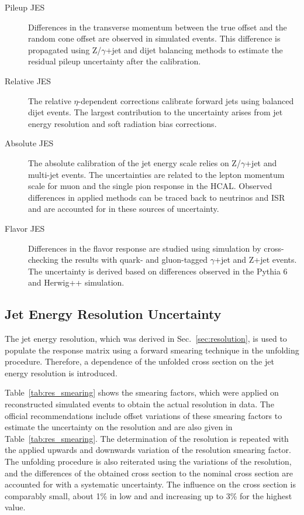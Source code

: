 \begin{description}
    \item[Pileup JES] Differences in the transverse momentum between the true
        offset and the random cone offset are observed in simulated events. This
        difference is propagated using Z/$\gamma$+jet and dijet balancing
        methods to estimate the residual pileup uncertainty after the
        calibration.
    \item[Relative JES] The relative $\eta$-dependent corrections calibrate
        forward jets using balanced dijet events. The largest contribution to
        the uncertainty arises from jet energy resolution and soft radiation
        bias corrections. 
    \item[Absolute JES]  The absolute calibration of the jet energy scale relies
        on Z/$\gamma$+jet and multi-jet events. The uncertainties are related to
        the lepton momentum scale for muon and the single pion response in the
        HCAL. Observed differences in applied methods can be traced back to neutrinos
        and ISR and are accounted for in these sources of uncertainty.
    \item[Flavor JES] Differences in the flavor response are studied using
        simulation by cross-checking the results with quark- and gluon-tagged
        $\gamma$+jet and Z+jet events. The uncertainty is derived based on
        differences observed in the Pythia 6 and Herwig++ simulation.
\end{description}

\subsection{Jet Energy Resolution Uncertainty}

The jet energy resolution, which was derived in Sec.~\ref{sec:resolution}, is
used to populate the response matrix using a forward smearing technique in the
unfolding procedure. Therefore, a dependence of the
unfolded cross section on the jet energy resolution is introduced. 

Table~\ref{tab:res_smearing} shows the smearing factors, which were applied on
reconstructed simulated events to obtain the actual resolution in data. The
official recommendations include offset variations of these smearing factors to
estimate the uncertainty on the resolution and are also given in
Table~\ref{tab:res_smearing}. The determination of the resolution is repeated
with the applied upwards and downwards variation of the resolution smearing
factor. The unfolding procedure is also reiterated using the variations of the
resolution, and the differences of the obtained cross section to the nominal
cross section are accounted for with a systematic uncertainty. The influence on
the cross section is comparably small, about 1\% in low \ystar and \yboost and
increasing up to 3\% for the highest \ystar value.

